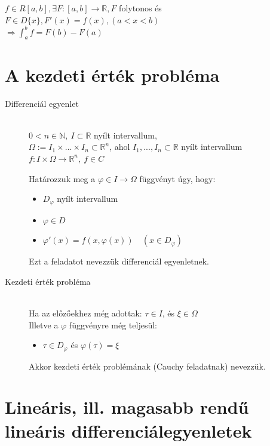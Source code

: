 \documentclass[margin=0px]{article}
\newcommand{\R}{\mathbb{R}}
\begin{document}
		$ f \in R[a,b], \exists F:[a,b] \rightarrow \R, F $ folytonos és $ F \in D\{x\}, F'(x) = f(x), (a < x < b) $ \\
		$ \Rightarrow \int_a^b f = F(b) - F(a) $
	\section{A kezdeti érték probléma}
		\begin{description}
			\item[Differenciál egyenlet] \hfill \\
				$ 0 < n \in \mathbb{N}, \ I \subset \R$ nyílt intervallum, \\
				$ \Omega := I_1 \times ... \times I_n \subset \R^n$, ahol $ I_1,...,I_n \subset \R$ nyílt intervallum \\
				$f:I\times\Omega \rightarrow \R^n, \ f \in C $
				
				Határozzuk meg a $ \varphi \in I \rightarrow \Omega$ függvényt úgy, hogy:
				\begin{itemize}
					\item $ D_{\varphi} $ nyílt intervallum
					\item $ \varphi \in D $
					\item $ \varphi'(x) = f(x, \varphi(x)) \quad (x \in D_{\varphi}) $
				\end{itemize}
				
				Ezt a feladatot nevezzük differenciál egyenletnek.
			\item[Kezdeti érték probléma] \hfill \\
				Ha az előzőekhez még adottak: $ \tau \in I$, és $ \xi \in \Omega$ \\
				Illetve a $\varphi$ függvényre még teljesül:
				\begin{itemize}
					\item $\tau \in D_{\varphi}$ és $ \varphi(\tau) = \xi $
				\end{itemize}
				
				Akkor kezdeti érték problémának (Cauchy feladatnak) nevezzük.
		\end{description}
	\section{Lineáris, ill. magasabb rendű lineáris differenciálegyenletek}
\end{document}
